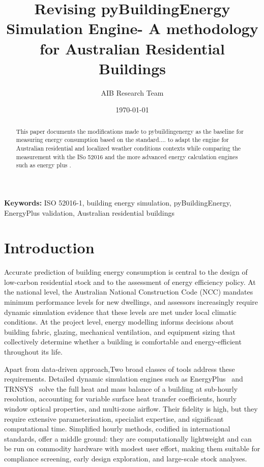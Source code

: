 \documentclass[12pt, a4paper]{article}
\title{
    \vspace{-0.5cm}
    \LARGE\textbf{Revising pyBuildingEnergy
    Simulation Engine- A methodology for Australian Residential Buildings}
    \vspace{0.3cm}
}
\author{
    AIB Research Team\\[0.3em]
}
\date{\today}
\begin{document}

\maketitle
\thispagestyle{fancy}

\begin{abstract}
\noindent
This paper documents the modifications made to pybuildingenergy as the baseline for measuring energy consumption based on the standard.... to adapt the engine for Australian residential and localized weather conditions contexts while comparing the measurement with the ISo 52016 and the more advanced energy calculation engines such as energy plus .





\end{abstract}

\vspace{0.3cm}
\noindent\textbf{Keywords:} ISO 52016-1, building energy simulation, pyBuildingEnergy,
EnergyPlus validation, Australian residential buildings

\tableofcontents
\newpage

\section{Introduction}
\label{sec:introduction}
 
Accurate prediction of building energy consumption is central to the design of
low-carbon residential stock and to the assessment of energy efficiency policy.
At the national level, the Australian National Construction Code (NCC) mandates
minimum performance levels for new dwellings, and assessors increasingly require
dynamic simulation evidence that these levels are met under local climatic conditions.
At the project level, energy modelling informs decisions about building fabric,
glazing, mechanical ventilation, and equipment sizing that collectively determine
whether a building is comfortable and energy-efficient throughout its life.
 
Apart from data-driven approach,Two broad classes of tools address these requirements.
Detailed dynamic simulation engines such as EnergyPlus~\cite{energyplus} and
TRNSYS~\cite{trnsys} solve the full heat and mass balance of a building at
sub-hourly resolution, accounting for variable surface heat transfer coefficients,
hourly window optical properties, and multi-zone airflow.
Their fidelity is high, but they require extensive parameterisation, specialist
expertise, and significant computational time.
Simplified hourly methods, codified in international standards, offer a middle
ground: they are computationally lightweight and can be run on commodity hardware
with modest user effort, making them suitable for compliance screening, early design
exploration, and large-scale stock analyses.
 
\end{document}

